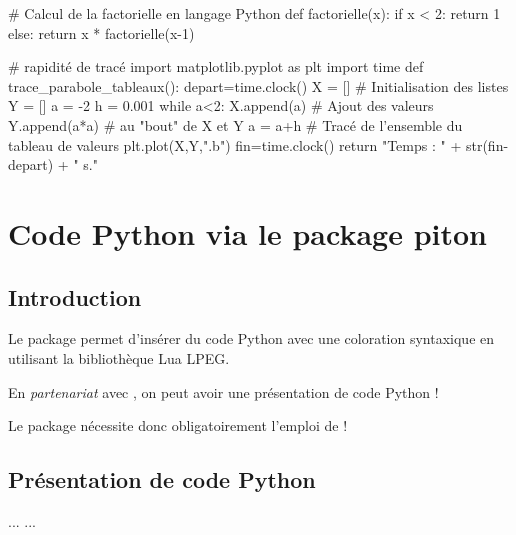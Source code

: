 \documentclass{article}
\newcommand\ctex[1]{\tcbox[vignettelatex]{#1}}
\begin{document}
\begin{codesortie}
\begin{scontents}[overwrite,write-out=testscript.py]
# Calcul de la factorielle en langage Python
def factorielle(x):
	if x < 2:
		return 1
	else:
		return x * factorielle(x-1)

# rapidité de tracé
import matplotlib.pyplot as plt
import time
def trace_parabole_tableaux():
	depart=time.clock()
	X = [] # Initialisation des listes
	Y = []
	a = -2
	h = 0.001
	while a<2:
		X.append(a) # Ajout des valeurs
		Y.append(a*a) # au "bout" de X et Y
		a = a+h
	# Tracé de l'ensemble du tableau de valeurs
	plt.plot(X,Y,".b")
	fin=time.clock()
	return "Temps : " + str(fin-depart) + " s."
\end{scontents}

\end{codesortie}

\newpage

\section{Code Python via le package piton}\label{pythonpiton}

\subsection{Introduction}

\begin{codeinfo}
Le package \ctex{piton} permet d'insérer du code Python avec une coloration syntaxique en utilisant la bibliothèque \textsf{Lua LPEG}.

\smallskip

En \textit{partenariat} avec \ctex{tcolorbox}, on peut avoir une présentation de code Python !
\end{codeinfo}

\begin{codeattention}
Le package \ctex{piton} nécessite donc obligatoirement l’emploi de \LuaLaTeX{} !
\end{codeattention}

\subsection{Présentation de code Python}

\begin{codetex}
\begin{envcodepiton}[<options>]
...
...
\end{envcodepiton}
\end{codetex}
\end{document}
